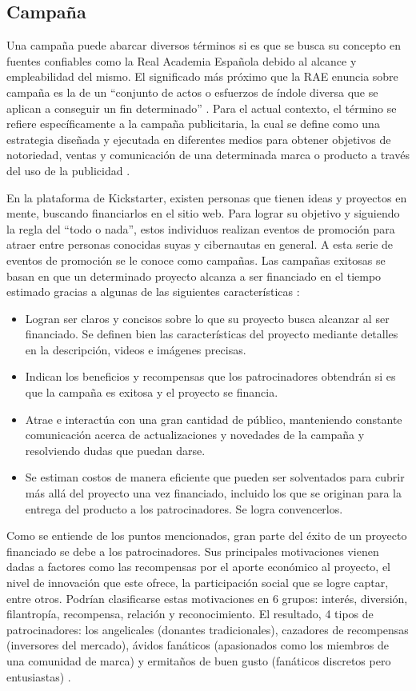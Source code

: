 \subsection{Campaña}
Una campaña puede abarcar diversos términos si es que se busca su concepto en fuentes confiables como la Real Academia Española debido al alcance y empleabilidad del mismo. El significado más próximo que la RAE enuncia sobre campaña es la de un “conjunto de actos o esfuerzos de índole diversa que se aplican a conseguir un fin determinado” \parencite{gl_rae}. Para el actual contexto, el término se refiere específicamente a la campaña publicitaria, la cual se define como una estrategia diseñada y ejecutada en diferentes medios para obtener objetivos de notoriedad, ventas y comunicación de una determinada marca o producto a través del uso de la publicidad \parencite{tec_cyberclic_campaign}.

En la plataforma de Kickstarter, existen personas que tienen ideas y proyectos en mente, buscando financiarlos en el sitio web. Para lograr su objetivo y siguiendo la regla del “todo o nada”, estos individuos realizan eventos de promoción para atraer entre personas conocidas suyas y cibernautas en general. A esta serie de eventos de promoción se le conoce como campañas. Las campañas exitosas se basan en que un determinado proyecto alcanza a ser financiado en el tiempo estimado gracias a algunas de las siguientes características \parencite{cr_kickstarter_intro}:

\begin{itemize}
	\item Logran ser claros y concisos sobre lo que su proyecto busca alcanzar al ser financiado. Se definen bien las características del proyecto mediante detalles en la descripción, videos e imágenes precisas.
	\item Indican los beneficios y recompensas que los patrocinadores obtendrán si es que la campaña es exitosa y el proyecto se financia.
	\item Atrae e interactúa con una gran cantidad de público, manteniendo constante comunicación acerca de actualizaciones y novedades de la campaña y resolviendo dudas que puedan darse.
	\item Se estiman costos de manera eficiente que pueden ser solventados para cubrir más allá del proyecto una vez financiado, incluido los que se originan para la entrega del producto a los patrocinadores. Se logra convencerlos.
\end{itemize}

Como se entiende de los puntos mencionados, gran parte del éxito de un proyecto financiado se debe a los patrocinadores. Sus principales motivaciones vienen dadas a factores como las recompensas por el aporte económico al proyecto, el nivel de innovación que este ofrece, la participación social que se logre captar, entre otros. Podrían clasificarse estas motivaciones en 6 grupos: interés, diversión, filantropía, recompensa, relación y reconocimiento. El resultado, 4 tipos de patrocinadores: los angelicales (donantes tradicionales), cazadores de recompensas (inversores del mercado), ávidos fanáticos (apasionados como los miembros de una comunidad de marca) y ermitaños de buen gusto (fanáticos discretos pero entusiastas) \parencite{cr_tung2019backers}.